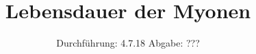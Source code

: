 

\subject{V 01}
\title{Lebensdauer der Myonen}
\date{
  Durchführung: 4.7.18
  \hspace{3em}
  Abgabe: ???
}



\maketitle
\thispagestyle{empty}
\tableofcontents
\newpage






\printbibliography




